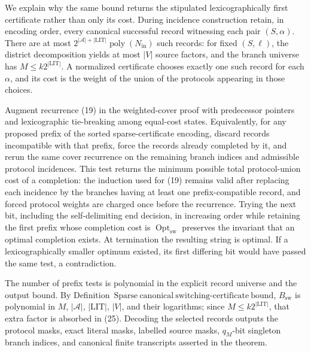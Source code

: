 We explain why the same bound returns the stipulated lexicographically first certificate rather than only its cost.  During incidence construction retain, in encoding order, every canonical successful record witnessing each pair \((S,\alpha)\).  There are at most \(2^{|\mathcal A|+|\mathrm{LIT}|}\operatorname{poly}(N_{\mathrm{in}})\) such records: for fixed \((S,\ell)\), the district decomposition yields at most \(|V|\) source factors, and the branch universe has \(M\leq k2^{|\mathrm{LIT}|}\).  A normalized certificate chooses exactly one such record for each \(\alpha\), and its cost is the weight of the union of the protocols appearing in those choices.

Augment recurrence (19) in the weighted-cover proof with predecessor pointers and lexicographic tie-breaking among equal-cost states.  Equivalently, for any proposed prefix of the sorted sparse-certificate encoding, discard records incompatible with that prefix, force the records already completed by it, and rerun the same cover recurrence on the remaining branch indices and admissible protocol incidences.  This test returns the minimum possible total protocol-union cost of a completion: the induction used for (19) remains valid after replacing each incidence by the branches having at least one prefix-compatible record, and forced protocol weights are charged once before the recurrence.  Trying the next bit, including the self-delimiting end decision, in increasing order while retaining the first prefix whose completion cost is \(\operatorname{Opt}_{\mathrm{sw}}\) preserves the invariant that an optimal completion exists.  At termination the resulting string is optimal.  If a lexicographically smaller optimum existed, its first differing bit would have passed the same test, a contradiction.

The number of prefix tests is polynomial in the explicit record universe and the output bound.  By Definition~\(\mathrm{Sparse\ canonical\ switching\mbox{-}certificate\ bound}\), \(B_{\mathrm{sw}}\) is polynomial in \(M\), \(|\mathcal A|\), \(|\mathrm{LIT}|\), \(|V|\), and their logarithms; since \(M\leq k2^{|\mathrm{LIT}|}\), that extra factor is absorbed in (25).  Decoding the selected records outputs the protocol masks, exact literal masks, labelled source masks, \(q_M\)-bit singleton branch indices, and canonical finite transcripts asserted in the theorem.

